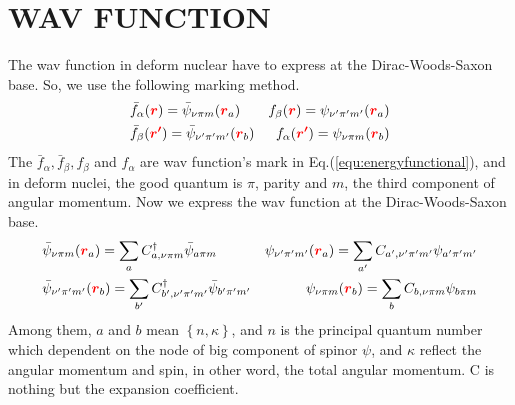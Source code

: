 \documentclass[a4paper]{article}
\newcommand{\bmm}[1]{{\color{red}\bm{#1}}}
\begin{document}
\section{WAV FUNCTION}
The wav function in deform nuclear have to express at the Dirac-Woods-Saxon base. So, we use the following marking method.
\begin{align}
&\bar{f}_{\alpha}(\bmm{r})=\bar{\psi}_{\nu \pi m}(\bmm{r}_{a}) &f_{\beta}(\bmm{r})=\psi_{\nu'\pi'm'}(\bmm{r}_{a})\\
&\bar{f}_{\beta}(\bmm{r'})=\bar{\psi}_{\nu'\pi'm'}(\bmm{r}_{b}) &f_{\alpha}(\bmm{r'})=\psi_{\nu \pi m}(\bmm{r}_{b})
\end{align}
The $\bar{f}_{\alpha},\bar{f}_{\beta},f_{\beta}$ and $f_{\alpha}$ are wav function's mark in Eq.(\ref{equ:energyfunctional}), and in deform nuclei, the good quantum is $\pi$, parity and $m$, the third component of angular momentum. Now we express the wav function at the Dirac-Woods-Saxon base.
\begin{align}
&\bar{\psi}_{\nu \pi m}(\bmm{r}_{a})=\sum_{a}C_{a,\nu \pi m}^{\dag}\bar{\psi}_{a\pi m} &\psi_{\nu'\pi'm'}(\bmm{r}_{a})=\sum_{a'}C_{a',\nu'\pi'm'}\psi_{a'\pi'm'}\\
&\bar{\psi}_{\nu'\pi'm'}(\bmm{r}_{b})=\sum_{b'}C_{b',\nu'\pi'm'}^{\dag}\bar{\psi}_{b'\pi'm'}
&\psi_{\nu\pi m}(\bmm{r}_{b})=\sum_{b}C_{b,\nu\pi m}\psi_{b\pi m}
\end{align}
Among them, $a$ and $b$ mean $\left\{n,\kappa\right\}$, and $n$ is the principal quantum number which dependent on the node of big component of spinor $\psi$, and $\kappa$ reflect the angular momentum and spin, in other word, the total angular momentum. C is nothing but the expansion coefficient.
\end{document}
